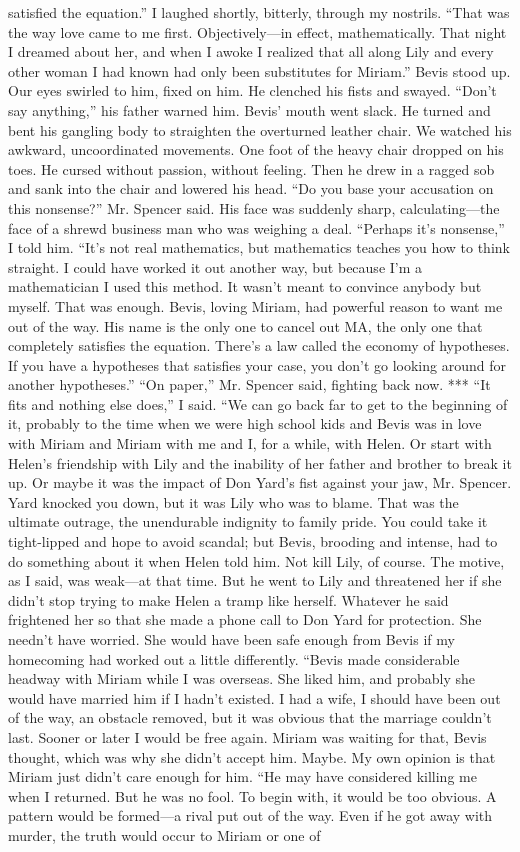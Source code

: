 \documentclass{novel}
\begin{document}
satisfied the equation.” I laughed shortly, bitterly, through my nostrils. “That was the way love came to me first. Objectively—in effect, mathematically. That night I dreamed about her, and when I awoke I realized that all along Lily and every other woman I had known had only been substitutes for Miriam.” Bevis stood up. Our eyes swirled to him, fixed on him. He clenched his fists and swayed. “Don’t say anything,” his father warned him. Bevis’ mouth went slack. He turned and bent his gangling body to straighten the overturned leather chair. We watched his awkward, uncoordinated movements. One foot of the heavy chair dropped on his toes. He cursed without passion, without feeling. Then he drew in a ragged sob and sank into the chair and lowered his head. “Do you base your accusation on this nonsense?” Mr. Spencer said. His face was suddenly sharp, calculating—the face of a shrewd business man who was weighing a deal. “Perhaps it’s nonsense,” I told him. “It’s not real mathematics, but mathematics teaches you how to think straight. I could have worked it out another way, but because I’m a mathematician I used this method. It wasn’t meant to convince anybody but myself. That was enough. Bevis, loving Miriam, had powerful reason to want me out of the way. His name is the only one to cancel out MA, the only one that completely satisfies the equation. There’s a law called the economy of hypotheses. If you have a hypotheses that satisfies your case, you don’t go looking around for another hypotheses.” “On paper,” Mr. Spencer said, fighting back now. *** “It fits and nothing else does,” I said. “We can go back far to get to the beginning of it, probably to the time when we were high school kids and Bevis was in love with Miriam and Miriam with me and I, for a while, with Helen. Or start with Helen’s friendship with Lily and the inability of her father and brother to break it up. Or maybe it was the impact of Don Yard’s fist against your jaw, Mr. Spencer. Yard knocked you down, but it was Lily who was to blame. That was the ultimate outrage, the unendurable indignity to family pride. You could take it tight-lipped and hope to avoid scandal; but Bevis, brooding and intense, had to do something about it when Helen told him. Not kill Lily, of course. The motive, as I said, was weak—at that time. But he went to Lily and threatened her if she didn’t stop trying to make Helen a tramp like herself. Whatever he said frightened her so that she made a phone call to Don Yard for protection. She needn’t have worried. She would have been safe enough from Bevis if my homecoming had worked out a little differently. “Bevis made considerable headway with Miriam while I was overseas. She liked him, and probably she would have married him if I hadn’t existed. I had a wife, I should have been out of the way, an obstacle removed, but it was obvious that the marriage couldn’t last. Sooner or later I would be free again. Miriam was waiting for that, Bevis thought, which was why she didn’t accept him. Maybe. My own opinion is that Miriam just didn’t care enough for him. “He may have considered killing me when I returned. But he was no fool. To begin with, it would be too obvious. A pattern would be formed—a rival put out of the way. Even if he got away with murder, the truth would occur to Miriam or one of 
\end{document}
